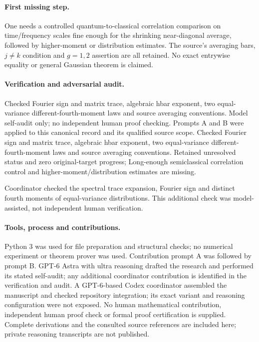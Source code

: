 \documentclass[11pt]{article}
\begin{document}
\paragraph{First missing step.} One needs a controlled quantum-to-classical correlation comparison on time/frequency scales fine enough for the shrinking near-diagonal average, followed by higher-moment or distribution estimates. The source's averaging bars, $j\ne k$ condition and $g=1,2$ assertion are all retained. No exact entrywise equality or general Gaussian theorem is claimed.

\paragraph{Verification and adversarial audit.}
Checked Fourier sign and matrix trace, algebraic hbar exponent, two equal-variance different-fourth-moment laws and source averaging conventions. Model self-audit only; no independent human proof checking. Prompts A and B were applied to this canonical record and its qualified source scope. Checked Fourier sign and matrix trace, algebraic hbar exponent, two equal-variance different-fourth-moment laws and source averaging conventions. Retained unresolved status and zero original-target progress; Long-enough semiclassical correlation control and higher-moment/distribution estimates are missing.

Coordinator checked the spectral trace expansion, Fourier sign and distinct fourth moments of equal-variance distributions. This additional check was model-assisted, not independent human verification.

\paragraph{Tools, process and contributions.}
Python 3 was used for file preparation and structural checks; no numerical experiment or theorem prover was used. Contribution prompt A was followed by prompt B. GPT-6 Astra with ultra reasoning drafted the research and performed its stated self-audit; any additional coordinator contribution is identified in the verification and audit. A GPT-6-based Codex coordinator assembled the manuscript and checked repository integration; its exact variant and reasoning configuration were not exposed. No human mathematical contribution, independent human proof check or formal proof certification is supplied. Complete derivations and the consulted source references are included here; private reasoning transcripts are not published.
\end{document}
